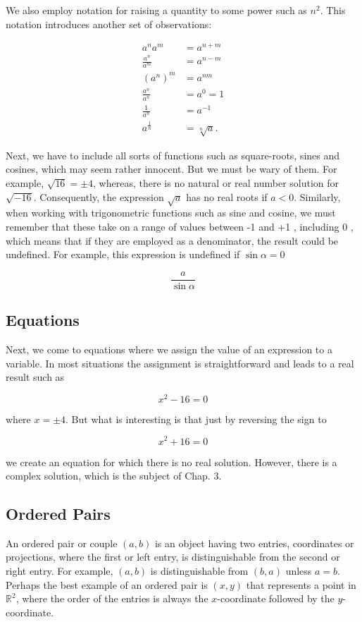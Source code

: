 \documentclass[10pt]{article}
\begin{document}
We also employ notation for raising a quantity to some power such as $n^{2}$. This notation introduces another set of observations:

$$
\begin{aligned}
a^{n} a^{m} & =a^{n+m} \\
\frac{a^{n}}{a^{m}} & =a^{n-m} \\
\left(a^{n}\right)^{m} & =a^{n m} \\
\frac{a^{n}}{a^{n}} & =a^{0}=1 \\
\frac{1}{a^{n}} & =a^{-1} \\
a^{\frac{1}{n}} & =\sqrt[n]{a} .
\end{aligned}
$$

Next, we have to include all sorts of functions such as square-roots, sines and cosines, which may seem rather innocent. But we must be wary of them. For example, $\sqrt{16}= \pm 4$, whereas, there is no natural or real number solution for $\sqrt{-16}$. Consequently, the expression $\sqrt{a}$ has no real roots if $a<0$. Similarly, when working with trigonometric functions such as sine and cosine, we must remember that these take on a range of values between -1 and +1 , including 0 , which means that if they are employed as a denominator, the result could be undefined. For example, this expression is undefined if $\sin \alpha=0$

$$
\frac{a}{\sin \alpha}
$$

\subsection{Equations}
Next, we come to equations where we assign the value of an expression to a variable. In most situations the assignment is straightforward and leads to a real result such as

$$
x^{2}-16=0
$$

where $x= \pm 4$. But what is interesting is that just by reversing the sign to

$$
x^{2}+16=0
$$

we create an equation for which there is no real solution. However, there is a complex solution, which is the subject of Chap. 3.

\subsection{Ordered Pairs}
An ordered pair or couple $(a, b)$ is an object having two entries, coordinates or projections, where the first or left entry, is distinguishable from the second or right entry. For example, $(a, b)$ is distinguishable from $(b, a)$ unless $a=b$. Perhaps the best example of an ordered pair is $(x, y)$ that represents a point in $\mathbb{R}^{2}$, where the order of the entries is always the $x$-coordinate followed by the $y$-coordinate.
\end{document}

